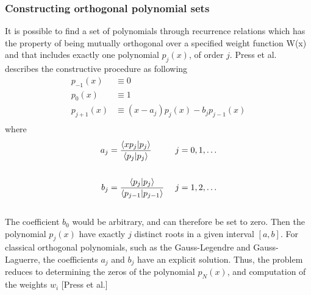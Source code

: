 \documentclass[%
reprint,nofootinbib,
amsmath,amssymb,
aps,
]{revtex4-1}
\begin{document}
\subsubsection{Constructing orthogonal polynomial sets} \noindent 
It is possible to find a set of polynomials through recurrence relations which has the property of being mutually orthogonal over a specified weight function W(x) and that includes exactly one polynomial $p_j(x)$, of order $j$. Press et al. describes the constructive procedure as following\vspace{0.5mm} \\
\begin{align*}
	p_{-1}(x) &\equiv 0\\
	p_{0}(x) &\equiv 1\\
	p_{j+1}(x) &\equiv (x-a_j)p_j(x)-b_jp_{j-1}(x)\\
\end{align*} 
where  \\
\begin{align*}
	a_j &= \dfrac{\braket{xp_j}{p_j}}{\braket{p_j}{p_j}} &\hspace{1mm} j = 0,1, \dots \\ &&\\
	b_j &=\dfrac{\braket{p_j}{p_j}}{\braket{p_{j-1}}{p_{j-1}}} &\hspace{1mm} j = 1,2, \dots
\end{align*} \vspace{0.5mm} \\
The coefficient $b_0$ would be arbitrary, and can therefore be set to zero. Then the polynomial $p_j(x)$ have exactly $j$ distinct roots in a given interval $[a,b]$. For classical orthogonal polynomials, such as the Gauss-Legendre and Gauss-Laguerre, the coefficients $a_j$ and $b_j$ have an explicit solution. Thus, the problem reduces to determining the zeros of the polynomial $p_N(x)$, and computation of the weights $w_i$ [Press et al.]
\end{document}
